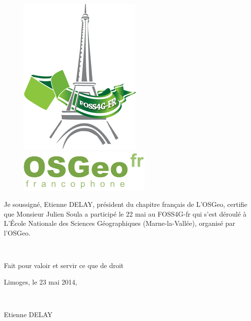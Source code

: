 \documentclass[parskip]{scrartcl}
\begin{document}
\begin{figure}
	\begin{center}
		\includegraphics[scale=0.8]{logo}
        \hspace{1cm}
		\includegraphics[scale=0.4]{logo-osgeofr}
	\end{center}
\end{figure}


\vfill

Je soussigné, Etienne DELAY, président du chapitre français de L'OSGeo, certifie que Monsieur Julien Soula a participé le 22 mai au FOSS4G-fr qui s'est déroulé
à L'\'Ecole Nationale des Sciences Géographiques (Marne-la-Vallée), organisé par l'OSGeo.

~

\noindent Fait pour valoir et servir ce que de droit

Limoges, le 23 mai 2014,

~


\hfill Etienne DELAY

\vfill
\end{document}
